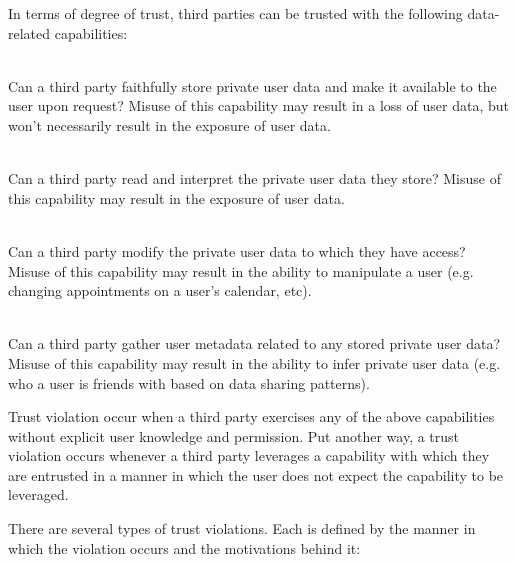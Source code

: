 In terms of degree of trust, third parties can be trusted with the
following data-related capabilities:

\begin{packed_desc}
\item[Storage (S):] \hfill \\ Can a third party faithfully store
  private user data and make it available to the user upon request?
  Misuse of this capability may result in a loss of user data, but
  won't necessarily result in the exposure of user data.
\item[Access (R):] \hfill \\ Can a third party read and interpret the
  private user data they store? Misuse of this capability may result
  in the exposure of user data.
\item[Manipulation (W):] \hfill \\ Can a third party modify the
  private user data to which they have access? Misuse of this
  capability may result in the ability to manipulate a user
  (e.g. changing appointments on a user's calendar, etc).
\item[Meta-analysis (M):] \hfill \\ Can a third party gather user
  metadata related to any stored private user data? Misuse of this
  capability may result in the ability to infer private user data
  (e.g. who a user is friends with based on data sharing patterns).
\end{packed_desc}

Trust violation occur when a third party exercises any of the above
capabilities without explicit user knowledge and permission. Put
another way, a trust violation occurs whenever a third party leverages
a capability with which they are entrusted in a manner in which the
user does not expect the capability to be leveraged.

There are several types of trust violations. Each is defined by the
manner in which the violation occurs and the motivations behind it:

